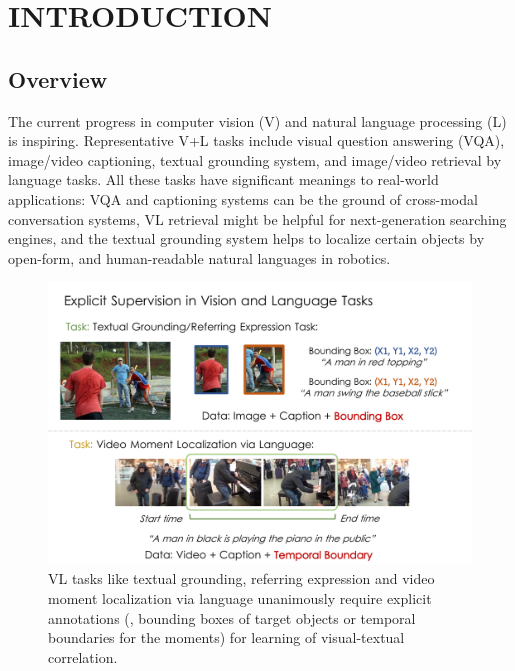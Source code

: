 \chapter{INTRODUCTION}

\section{Overview}
The current progress in computer vision (V) and natural language processing (L) is inspiring. Representative V+L tasks include visual question answering (VQA), image/video captioning, textual grounding system, and image/video retrieval by language tasks. All these tasks have significant meanings to real-world applications: VQA and captioning systems can be the ground of cross-modal conversation systems, VL retrieval might be helpful for next-generation searching engines, and the textual grounding system helps to localize certain objects by open-form, and human-readable natural languages in robotics.


\begin{figure}
\begin{center}
\includegraphics[width=.99\textwidth]{images/explicit_training.pdf}
\end{center}
\caption[Example of some VL tasks.]{VL tasks like textual grounding, referring expression and video moment localization via language unanimously require explicit annotations (\ie, bounding boxes of target objects or temporal boundaries for the moments) for learning of visual-textual correlation.
}
\label{fig:explicit_learning}
\end{figure}

